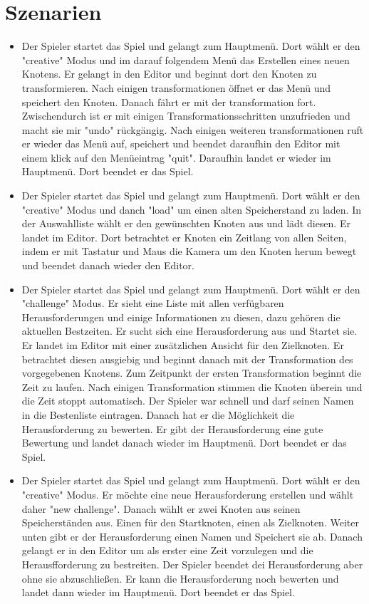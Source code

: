 \section{Szenarien}
\begin{itemize}	
\item Der Spieler startet das Spiel und gelangt zum Hauptmenü. Dort wählt er den "creative" Modus und im darauf folgendem Menü das Erstellen eines neuen Knotens. Er gelangt in den Editor und beginnt dort den Knoten zu transformieren. Nach einigen transformationen öffnet er das Menü und speichert den Knoten. Danach fährt er mit der transformation fort. Zwischendurch ist er mit einigen Transformationsschritten unzufrieden und macht sie mir "undo" rückgängig. Nach einigen weiteren transformationen ruft er wieder das Menü auf, speichert und beendet daraufhin den Editor mit einem klick auf den Menüeintrag "quit". Daraufhin landet er wieder im Hauptmenü. Dort beendet er das Spiel.

\item Der Spieler startet das Spiel und gelangt zum Hauptmenü. Dort wählt er den "creative" Modus und danch "load" um einen alten Speicherstand zu laden. In der Auswahlliste wählt er den gewünschten Knoten aus und lädt diesen. Er landet im Editor. Dort betrachtet er Knoten ein Zeitlang von allen Seiten, indem er mit Tastatur und Maus die Kamera um den Knoten herum bewegt und beendet danach wieder den Editor.

\item  Der Spieler startet das Spiel und gelangt zum Hauptmenü. Dort wählt er den "challenge" Modus. Er sieht eine Liste mit allen verfügbaren Herausforderungen und einige Informationen zu diesen, dazu gehören die aktuellen Bestzeiten. Er sucht sich eine Herausforderung aus und Startet sie. Er landet im Editor mit einer zusätzlichen Ansicht für den Zielknoten. Er betrachtet diesen ausgiebig und beginnt danach mit der Transformation des vorgegebenen Knotens. Zum Zeitpunkt der ersten Transformation beginnt die Zeit zu laufen. Nach einigen Transformation stimmen die Knoten überein und die Zeit stoppt automatisch. Der Spieler war schnell und darf seinen Namen in die Bestenliste eintragen. Danach hat er die Möglichkeit die Herausforderung zu bewerten. Er gibt der Herausforderung eine gute Bewertung und landet danach wieder im Hauptmenü. Dort beendet er das Spiel.

\item Der Spieler startet das Spiel und gelangt zum Hauptmenü. Dort wählt er den "creative" Modus. Er möchte eine neue Herausforderung erstellen und wählt daher "new challenge". Danach wählt er zwei Knoten aus seinen Speicherständen aus. Einen für den Startknoten, einen als Zielknoten. Weiter unten gibt er der Herausforderung einen Namen und Speichert sie ab. Danach gelangt er in den Editor um als erster eine Zeit vorzulegen und die Herausfforderung zu bestreiten. Der Spieler beendet dei Herausforderung aber ohne sie abzuschließen. Er kann die Herausforderung noch bewerten und landet dann wieder im Hauptmenü. Dort beendet er das Spiel.
\end{itemize}

